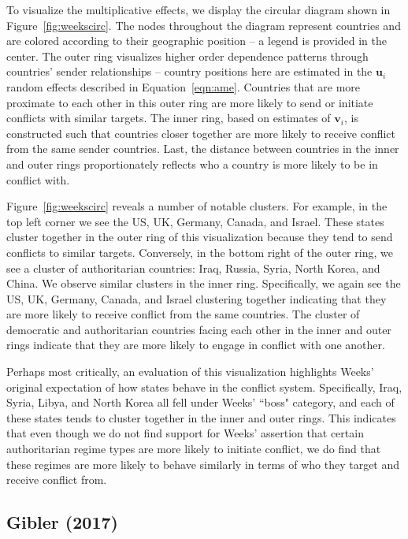 To visualize the multiplicative effects, we display the circular diagram shown in Figure~\ref{fig:weekscirc}. The nodes throughout the diagram represent countries and are colored according to their geographic position -- a legend is provided in the center. The outer ring visualizes higher order dependence patterns through countries' sender relationships -- country positions here are estimated in the $\mathbf{u}_{i}$ random effects described in Equation~\ref{eqn:ame}. Countries that are more proximate to each other in this outer ring are more likely to send or initiate conflicts with similar targets. The inner ring, based on estimates of $\mathbf{v}_{i}$, is constructed such that countries closer together are more likely to receive conflict from the same sender countries. Last, the distance between countries in the inner and outer rings proportionately reflects who a country is more likely to be in conflict with.

Figure~\ref{fig:weekscirc} reveals a number of notable clusters. For example, in the top left corner we see the US, UK, Germany, Canada, and Israel. These states cluster together in the outer ring of this visualization because they tend to send conflicts to similar targets. Conversely, in the bottom right of the outer ring, we see a cluster of authoritarian countries: Iraq, Russia, Syria, North Korea, and China. We observe similar clusters in the inner ring. Specifically, we again see the US, UK, Germany, Canada, and Israel clustering together indicating that they are more likely to receive conflict from the same countries.  The  cluster of democratic and authoritarian countries facing each other in the inner and outer rings indicate that they are more likely to engage in conflict with one another.

Perhaps most critically, an evaluation of this visualization highlights Weeks' original expectation of how states behave in the conflict system.  Specifically, Iraq, Syria, Libya, and North Korea all fell under Weeks' ``boss" category, and each of these states tends to cluster together in the inner and outer rings. This indicates that even though we do not find support for Weeks' assertion that certain authoritarian regime types are more likely to initiate conflict, we do find that these regimes are more likely to behave similarly in terms of who they target and receive conflict from.

\subsection{Gibler (2017)}

